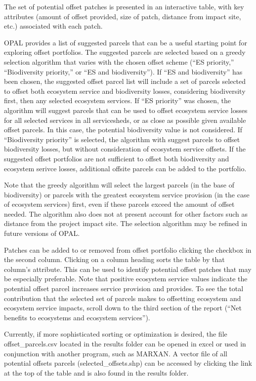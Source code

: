 \documentclass[11pt,letterpaper]{report}
\newenvironment{myenumerate}{%
	\edef\backupindent{\the\parindent}
	\enumerate
	\setlength{\parindent}{\backupindent}
		\setlist[enumerate,1]{label=(\arabic*)}
		\setlist[enumerate,2]{label=(\arabic*)}
}{\endenumerate}
\begin{document}
\begin{myenumerate}
			The set of potential offset patches is presented in an interactive table, with key attributes (amount of offset provided, size of patch, distance from impact site, etc.) associated with each patch.
	
			OPAL provides a list of suggested parcels that can be a useful starting point for exploring offset portfolios. The suggested parcels are selected based on a greedy selection algorithm that varies with the chosen offset scheme (``ES priority,'' ``Biodiversity priority,'' or ``ES and biodiversity''). If ``ES and biodiversity'' has been chosen, the suggested offset parcel list will include a set of parcels selected to offset both ecosystem service and biodiversity losses, considering biodiversity first, then any selected ecosystem services. If ``ES priority'' was chosen, the algorithm will suggest parcels that can be used to offset ecosystem service losses for all selected services in all servicesheds, or as close as possible given available offset parcels. In this case, the potential biodiversity value is not considered. If ``Biodiversity priority'' is selected, the algorithm with suggest parcels to offset biodiversity losses, but without consideration of ecosystem service offsets. If the suggested offset portfolios are not sufficient to offset both biodiversity and ecosystem serivce losses, additional offsite parcels can be added to the portfolio.
			
			Note that the greedy algorithm will select the largest parcels (in the base of biodiversity) or parcels with the greatest ecosystem service provision (in the case of ecosystem services) first, even if these parcels exceed the amount of offset needed. The algorithm also does not at present account for other factors such as distance from the project impact site. The selection algorithm may be refined in future versions of OPAL.
			
			Patches can be added to or removed from offset portfolio clicking the checkbox in the second column. Clicking on a column heading sorts the table by that column's attribute. This can be used to identify potential offset patches that may be especially preferable. Note that positive ecosystem service values indicate the potential offset parcel increases service provision and provides. To see the total contribution that the selected set of parcels makes to offsetting ecosystem and ecosystem service impacts, scroll down to the third section of the report (``Net benefits to ecosystems and ecosystem services'').
			
			Currently, if more sophisticated sorting or optimization is desired, the file offset\_{}parcels.csv located in the results folder can be opened in excel or used in conjunction with another program, such as MARXAN. A vector file of all potential offsets parcels (selected\_{}offsets.shp) can be accessed by clicking the link at the top of the table and is also found in the results folder.
		

\end{myenumerate}
\end{document}

